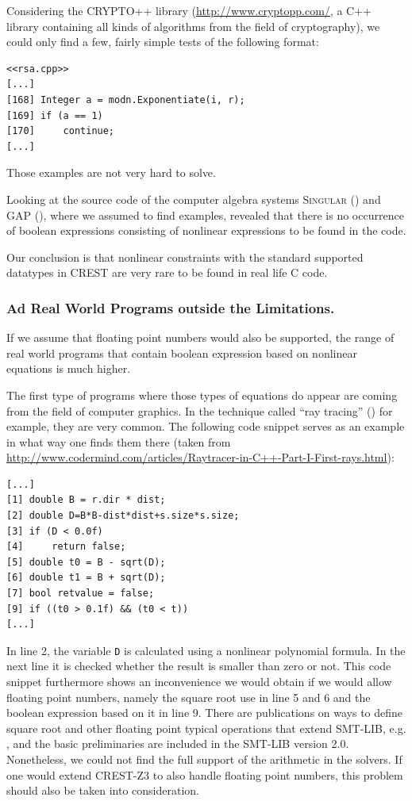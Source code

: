 \documentclass[oribibl, twocolumn]{llncs}
\begin{document}
Considering the \textsc{CRYPTO++} library
(\url{http://www.cryptopp.com/}, a \textsc{C++} library containing all kinds of algorithms from the field of cryptography), we could only find a few, fairly
simple tests of the following format:

\begin{verbatim}
<<rsa.cpp>>
[...]
[168] Integer a = modn.Exponentiate(i, r);
[169] if (a == 1)
[170]     continue;
[...]
\end{verbatim}

Those examples are not very hard to solve.

Looking at the source code of the computer algebra systems \textsc{Singular} (\cite{Singular:2012})
and \textsc{GAP} (\cite{GAP4}), where we assumed to find examples,
revealed that there is no occurrence of boolean expressions consisting
of nonlinear expressions to be
found in the code.

Our conclusion is that nonlinear constraints with the standard
supported datatypes in \textsc{CREST} are very rare to be found in
real life \textsc{C} code.

\subsubsection{Ad Real World Programs outside the Limitations.}

If we assume that floating point numbers would also be supported, the
range of real world programs that contain boolean expression based on
nonlinear equations is much higher.

The first type of programs where those types of equations do appear
are coming from the field of computer graphics. In the technique called ``ray
tracing'' (\cite{glassner1989introduction}) for example, they are very common. The following code snippet serves as an example in what way one finds them there (taken from \url{http://www.codermind.com/articles/Raytracer-in-C++-Part-I-First-rays.html}):
\begin{verbatim}
[...]
[1] double B = r.dir * dist;
[2] double D=B*B-dist*dist+s.size*s.size; 
[3] if (D < 0.0f) 
[4]     return false; 
[5] double t0 = B - sqrt(D); 
[6] double t1 = B + sqrt(D);
[7] bool retvalue = false;  
[9] if ((t0 > 0.1f) && (t0 < t)) 
[...]
\end{verbatim}

In line 2, the variable \texttt{D} is calculated using a nonlinear polynomial
formula. In the next line it is checked whether the result is smaller
than zero or not.
This code snippet furthermore shows an inconvenience we would obtain
if we would allow floating point numbers, namely the square root use
in line 5 and 6 and the boolean expression based on it in line 9. There are publications on ways to define square root and other
floating point typical operations that extend \textsc{SMT-LIB},
e.g. \cite{rummer2010smt}, and the basic preliminaries are included in
the \textsc{SMT-LIB} version 2.0. Nonetheless, we could not find the
full support of the arithmetic in the solvers. If one would extend
\textsc{CREST-Z3} to also handle floating point numbers, this problem
should also be taken into consideration.
\end{document}

